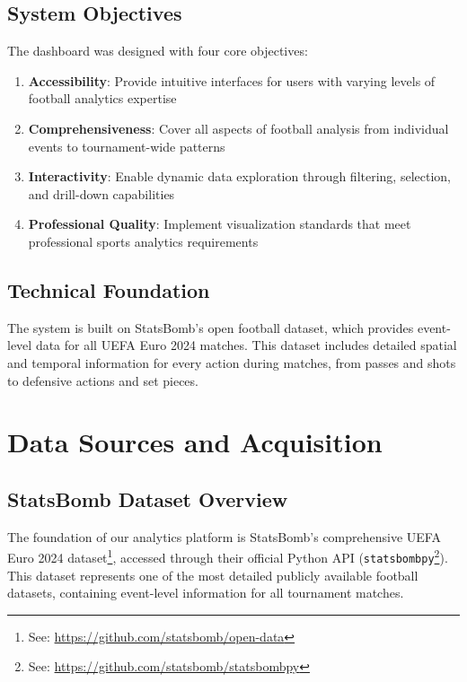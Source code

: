 \documentclass[12pt,a4paper]{article}
\begin{document}
\subsection{System Objectives}

The dashboard was designed with four core objectives:
\begin{enumerate}
    \item \textbf{Accessibility}: Provide intuitive interfaces for users with varying levels of football analytics expertise
    \item \textbf{Comprehensiveness}: Cover all aspects of football analysis from individual events to tournament-wide patterns
    \item \textbf{Interactivity}: Enable dynamic data exploration through filtering, selection, and drill-down capabilities
    \item \textbf{Professional Quality}: Implement visualization standards that meet professional sports analytics requirements
\end{enumerate}

\subsection{Technical Foundation}

The system is built on StatsBomb's open football dataset, which provides event-level data for all UEFA Euro 2024 matches. This dataset includes detailed spatial and temporal information for every action during matches, from passes and shots to defensive actions and set pieces.

\section{Data Sources and Acquisition}

\subsection{StatsBomb Dataset Overview}

The foundation of our analytics platform is StatsBomb's comprehensive UEFA Euro 2024 dataset\footnote{See: \url{https://github.com/statsbomb/open-data}}, accessed through their official Python API (\texttt{statsbombpy}\footnote{See: \url{https://github.com/statsbomb/statsbombpy}}). This dataset represents one of the most detailed publicly available football datasets, containing event-level information for all tournament matches.
\end{document}
